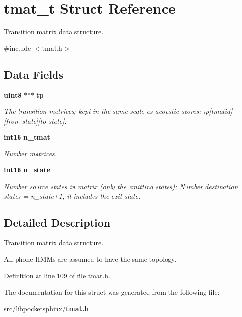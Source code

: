 \section{tmat\-\_\-t \-Struct \-Reference}
\label{structtmat__t}


\-Transition matrix data structure.  




{\ttfamily \#include $<$tmat.\-h$>$}

\subsection*{\-Data \-Fields}
\begin{DoxyCompactItemize}
\item 
{\bf uint8} $\ast$$\ast$$\ast$ {\bf tp}\label{structtmat__t_a9f518c96b30dab9efdb69bd779a7b5bf}

\begin{DoxyCompactList}\small\item\em \-The transition matrices; kept in the same scale as acoustic scores; tp[tmatid][from-\/state][to-\/state]. \end{DoxyCompactList}\item 
{\bf int16} {\bf n\-\_\-tmat}\label{structtmat__t_ada644af34d54256f1574870d5f7a6788}

\begin{DoxyCompactList}\small\item\em \-Number matrices. \end{DoxyCompactList}\item 
{\bf int16} {\bf n\-\_\-state}\label{structtmat__t_a3633c71659e30cf23bee1f7efb4b4805}

\begin{DoxyCompactList}\small\item\em \-Number source states in matrix (only the emitting states); \-Number destination states = n\-\_\-state+1, it includes the exit state. \end{DoxyCompactList}\end{DoxyCompactItemize}


\subsection{\-Detailed \-Description}
\-Transition matrix data structure. 

\-All phone \-H\-M\-Ms are assumed to have the same topology. 

\-Definition at line 109 of file tmat.\-h.



\-The documentation for this struct was generated from the following file\-:\begin{DoxyCompactItemize}
\item 
src/libpocketsphinx/{\bf tmat.\-h}\end{DoxyCompactItemize}
